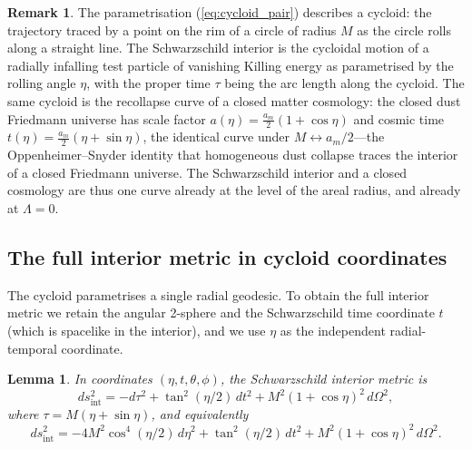 \documentclass[11pt,a4paper]{article}
\newtheorem{lemma}[theorem]{Lemma}
\theoremstyle{definition}
\newtheorem{remark}[theorem]{Remark}
\begin{document}
\begin{remark}
The parametrisation (\ref{eq:cycloid_pair}) describes a cycloid: the trajectory traced by a point on the rim of a circle of radius $M$ as the circle rolls along a straight line. The Schwarzschild interior is the cycloidal motion of a radially infalling test particle of vanishing Killing energy as parametrised by the rolling angle $\eta$, with the proper time $\tau$ being the arc length along the cycloid. The same cycloid is the recollapse curve of a closed matter cosmology: the closed dust Friedmann universe has scale factor $a(\eta)=\tfrac{a_{m}}{2}(1+\cos\eta)$ and cosmic time $t(\eta)=\tfrac{a_{m}}{2}(\eta+\sin\eta)$, the identical curve under $M\leftrightarrow a_{m}/2$---the Oppenheimer--Snyder identity that homogeneous dust collapse traces the interior of a closed Friedmann universe. The Schwarzschild interior and a closed cosmology are thus one curve already at the level of the areal radius, and already at $\Lambda=0$.
\end{remark}

\subsection{The full interior metric in cycloid coordinates}

The cycloid parametrises a single radial geodesic. To obtain the full interior metric we retain the angular 2-sphere and the Schwarzschild time coordinate $t$ (which is spacelike in the interior), and we use $\eta$ as the independent radial-temporal coordinate.

\begin{lemma}\label{lem:interior_metric}
In coordinates $(\eta, t, \theta, \phi)$, the Schwarzschild interior metric is
\begin{equation}\label{eq:interior_metric}
ds^2_{\text{int}} = -d\tau^2 + \tan^2(\eta/2)\, dt^2 + M^2(1+\cos\eta)^2\, d\Omega^2,
\end{equation}
where $\tau = M(\eta + \sin\eta)$, and equivalently
\begin{equation}\label{eq:interior_metric_eta}
ds^2_{\text{int}} = -4M^2\cos^4(\eta/2)\, d\eta^2 + \tan^2(\eta/2)\, dt^2 + M^2(1+\cos\eta)^2\, d\Omega^2.
\end{equation}
\end{lemma}
\end{document}
